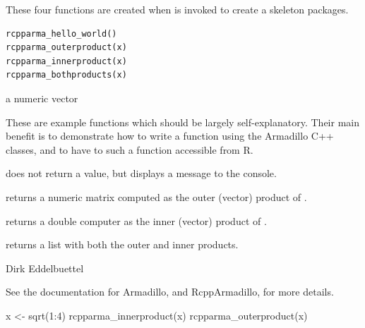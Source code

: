 \documentclass[letterpaper]{book}
\begin{document}
%
\begin{Description}
These four functions are created when
 is invoked to create a
skeleton packages.
\end{Description}
%
\begin{Usage}
\begin{verbatim}
rcpparma_hello_world()
rcpparma_outerproduct(x)
rcpparma_innerproduct(x)
rcpparma_bothproducts(x)
\end{verbatim}
\end{Usage}
%
\begin{Arguments}
\begin{ldescription}
\item[\code{x}] a numeric vector
\end{ldescription}
\end{Arguments}
%
\begin{Details}
These are example functions which should be largely
self-explanatory. Their main benefit is to demonstrate how to write a
function using the Armadillo C++ classes, and to have to such a
function accessible from R.
\end{Details}
%
\begin{Value}
 does not return a value, but displays a
message to the console.

 returns a numeric matrix computed as the
outer (vector) product of .

 returns a double computer as the inner
(vector) product of .

 returns a list with both the outer and
inner products.

\end{Value}
%
\begin{Author}
Dirk Eddelbuettel
\end{Author}
%
\begin{References}
See the documentation for Armadillo, and RcppArmadillo, for more details.
\end{References}
%
\begin{Examples}
\begin{ExampleCode}
  x <- sqrt(1:4)
  rcpparma_innerproduct(x)
  rcpparma_outerproduct(x)
\end{ExampleCode}
\end{Examples}
\end{document}
